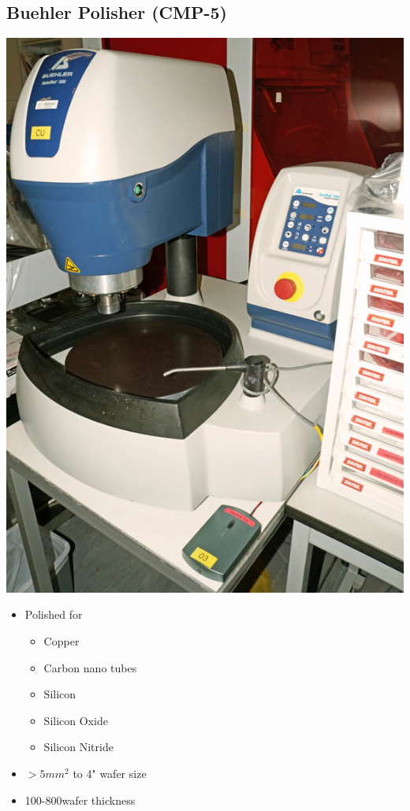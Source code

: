 \subsection{Buehler Polisher (CMP-5)}\label{cmp_machine_unclean}

\begin{minipage}[H]{\MachinePictureWidth}
	\includegraphics[width=\MachinePictureWidth]{pictures_machines/copper_polisher.png}
\end{minipage}\begin{minipage}[H]{0.5\textwidth}
\begin{itemize}
	\item Polished for
	\begin{itemize}
		\item Copper
		\item Carbon nano tubes
		\item Silicon
		\item Silicon Oxide 
		\item Silicon Nitride
	\end{itemize}
	\item $>5mm^2$ to 4" wafer size
	\item 100-800\um wafer thickness
\end{itemize}
\end{minipage}